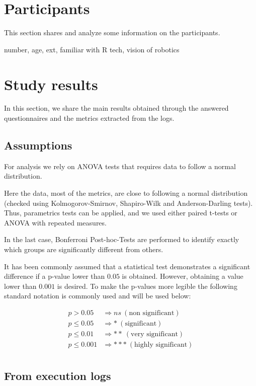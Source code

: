 \section{Participants}

This section shares and analyze some information on the participants.

number, age, ext, familiar with R tech, vision of robotics

\section{Study results}

In this section, we share the main results obtained through the answered questionnaires and the metrics extracted from the logs.

\subsection{Assumptions}

For analysis we rely on ANOVA tests that requires data to follow a normal distribution. 

Here the data, most of the metrics, are close to following a normal distribution (checked using Kolmogorov-Smirnov, Shapiro-Wilk and Anderson-Darling tests). Thus, parametrics tests can be applied, and we used either paired t-tests or ANOVA with repeated measures.

In the last case, Bonferroni Post-hoc-Tests are performed to identify exactly which groups are significantly different from others.

It has been commonly assumed that a statistical test demonstrates a significant difference if a p-value lower than $0.05$ is obtained. However, obtaining a value lower than $0.001$ is desired. To make the p-values more legible the following standard notation is commonly used and will be used below:

\begin{align*}
    p > 0.05        & \Rightarrow ns ~ (\textrm{non significant})\\
    p \leq 0.05     & \Rightarrow * ~ (\textrm{significant})\\
    p \leq 0.01     & \Rightarrow ** ~ (\textrm{very significant})\\
    p \leq 0.001    & \Rightarrow *** ~ (\textrm{highly significant})\\
\end{align*}


\subsection{From execution logs}

